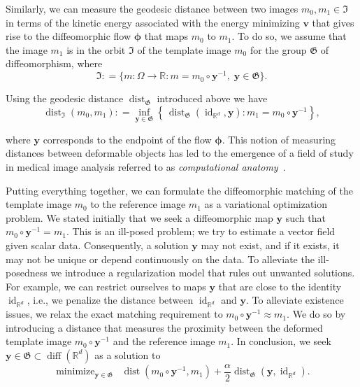\documentclass[11pt]{amsart}
\newcommand\fs[1]{\ensuremath{\mathfrak{#1}}}
\newcommand{\defeq}{\ensuremath{\mathrel{\mathop:}=}}
\DeclareMathOperator*\minopt{\ensuremath{minimize}}
\renewcommand{\vec}[1]{\ensuremath{\boldsymbol{#1}}}
\begin{document}
Similarly, we can measure the geodesic distance between two images $m_0,m_1 \in \fs{I}$ in terms of the kinetic energy associated with the energy minimizing $\vec{v}$ that gives rise to the diffeomorphic flow $\vec{\phi}$ that maps $m_0$ to $m_1$. To do so, we assume that the image $m_1$ is in the orbit $\fs{I}$ of the template image $m_0$ for the group $\fs{G}$ of diffeomorphism, where
\[
\fs{I} \defeq \{ m : \Omega \to \mathbb{R} : m = m_0 \circ \vec{y}^{-1}, \; \vec{y} \in \fs{G} \}.
\]

\noindent Using the geodesic distance $\operatorname{dist}_{\fs{G}}$ introduced above we have
\[
\operatorname{dist}_{\fs{I}}(m_0,m_1) \defeq \inf_{\vec{y} \in \fs{G}}
\left\{\,
\operatorname{dist}_{\fs{G}}(\operatorname{id}_{\mathbb{R}^d},\vec{y})
: m_1 = m_0 \circ \vec{y}^{-1}\right\},
\]

\noindent where $\vec{y}$ corresponds to the endpoint of the flow $\vec{\phi}$. This notion of measuring distances between deformable objects has led to the emergence of a field of study in medical image analysis referred to as \emph{computational anatomy}~\cite{Grenander:1998a,Miller:2004a,Miller:2002a,Younes:2009a,Miller:2015a}.


Putting everything together, we can formulate the diffeomorphic matching of the template image $m_0$ to the reference image $m_1$ as a variational optimization problem. We stated initially that we seek a diffeomorphic map $\vec{y}$ such that $m_0 \circ \vec{y}^{-1} = m_1$. This is an ill-posed problem; we try to estimate a vector field given scalar data. Consequently, a solution $\vec{y}$ may not exist, and if it exists, it may not be unique or depend continuously on the data. To alleviate the ill-posedness we introduce a regularization model that rules out unwanted solutions. For example, we can restrict ourselves to maps $\vec{y}$ that are close to the identity $\operatorname{id}_{\mathbb{R}^d}$, i.e., we penalize the distance between $\operatorname{id}_{\mathbb{R}^d}$ and $\vec{y}$. To alleviate existence issues, we relax the exact matching requirement to $m_0 \circ \vec{y}^{-1} \approx m_1$. We do so by introducing a distance that measures the proximity between the deformed template image $m_0 \circ \vec{y}^{-1}$ and the reference image $m_1$. In conclusion, we seek $\vec{y} \in \fs{G} \subset \operatorname{diff}(\mathbb{R}^d)$ as a solution to
\[
\minopt_{\vec{y} \in \fs{G}} \;\;
\operatorname{dist}(m_0 \circ \vec{y}^{-1},m_1)
+ \frac{\alpha}{2}\operatorname{dist}_{\fs{G}}(\vec{y}, \operatorname{id}_{\mathbb{R}^d}).
\]
\end{document}
